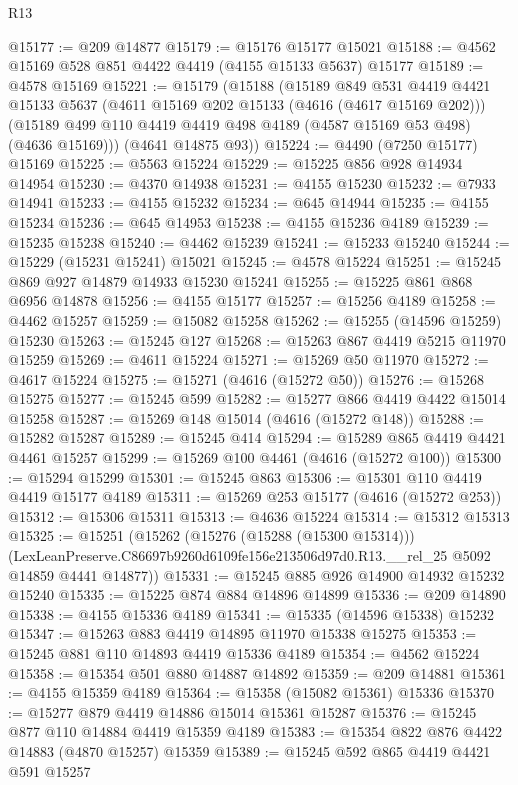 \begin{lexlean}{R13}
\begin{coremodule}
@15177 := @209 @14877
@15179 := @15176 @15177 @15021
@15188 := @4562 @15169 @528 @851 @4422 @4419 (@4155 @15133 @5637) @15177
@15189 := @4578 @15169
@15221 := @15179
    (@15188
      (@15189
        @849
        @531
        @4419
        @4421
        @15133
        @5637
        (@4611 @15169 @202 @15133 (@4616 (@4617 @15169 @202)))
        (@15189 @499 @110 @4419 @4419 @498 @4189 (@4587 @15169 @53 @498) (@4636 @15169)))
      (@4641 @14875 @93))
@15224 := @4490 (@7250 @15177) @15169
@15225 := @5563 @15224
@15229 := @15225 @856 @928 @14934 @14954
@15230 := @4370 @14938
@15231 := @4155 @15230
@15232 := @7933 @14941
@15233 := @4155 @15232
@15234 := @645 @14944
@15235 := @4155 @15234
@15236 := @645 @14953
@15238 := @4155 @15236 @4189
@15239 := @15235 @15238
@15240 := @4462 @15239
@15241 := @15233 @15240
@15244 := @15229 (@15231 @15241) @15021
@15245 := @4578 @15224
@15251 := @15245 @869 @927 @14879 @14933 @15230 @15241
@15255 := @15225 @861 @868 @6956 @14878
@15256 := @4155 @15177
@15257 := @15256 @4189
@15258 := @4462 @15257
@15259 := @15082 @15258
@15262 := @15255 (@14596 @15259) @15230
@15263 := @15245 @127
@15268 := @15263 @867 @4419 @5215 @11970 @15259
@15269 := @4611 @15224
@15271 := @15269 @50 @11970
@15272 := @4617 @15224
@15275 := @15271 (@4616 (@15272 @50))
@15276 := @15268 @15275
@15277 := @15245 @599
@15282 := @15277 @866 @4419 @4422 @15014 @15258
@15287 := @15269 @148 @15014 (@4616 (@15272 @148))
@15288 := @15282 @15287
@15289 := @15245 @414
@15294 := @15289 @865 @4419 @4421 @4461 @15257
@15299 := @15269 @100 @4461 (@4616 (@15272 @100))
@15300 := @15294 @15299
@15301 := @15245 @863
@15306 := @15301 @110 @4419 @4419 @15177 @4189
@15311 := @15269 @253 @15177 (@4616 (@15272 @253))
@15312 := @15306 @15311
@15313 := @4636 @15224
@15314 := @15312 @15313
@15325 := @15251
    (@15262
      (@15276 (@15288 (@15300 @15314)))
      (LexLeanPreserve.C86697b9260d6109fe156e213506d97d0.R13.__rel_25 @5092 @14859 @4441 @14877))
@15331 := @15245 @885 @926 @14900 @14932 @15232 @15240
@15335 := @15225 @874 @884 @14896 @14899
@15336 := @209 @14890
@15338 := @4155 @15336 @4189
@15341 := @15335 (@14596 @15338) @15232
@15347 := @15263 @883 @4419 @14895 @11970 @15338 @15275
@15353 := @15245 @881 @110 @14893 @4419 @15336 @4189
@15354 := @4562 @15224
@15358 := @15354 @501 @880 @14887 @14892
@15359 := @209 @14881
@15361 := @4155 @15359 @4189
@15364 := @15358 (@15082 @15361) @15336
@15370 := @15277 @879 @4419 @14886 @15014 @15361 @15287
@15376 := @15245 @877 @110 @14884 @4419 @15359 @4189
@15383 := @15354 @822 @876 @4422 @14883 (@4870 @15257) @15359
@15389 := @15245 @592 @865 @4419 @4421 @591 @15257

\end{coremodule}
\end{lexlean}
